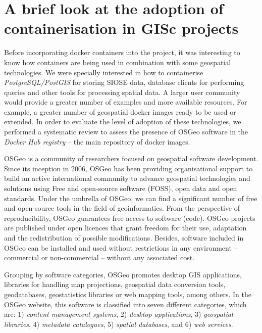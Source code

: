 \documentclass[ijgi,article,submit,moreauthors,pdftex]{Definitions/mdpi}
\begin{document}

\section{A brief look at the adoption of containerisation in GISc projects}
\label{sec:dockerhub}

Before incorporating docker containers into the project, it was interesting to know how containers are being used in combination with some geospatial technologies. We were specially interested in how to containerise \textit{PostgreSQL/PostGIS} for storing SIOSE data, database clients for performing queries and other tools for processing spatial data. A larger user community would provide a greater number of examples and more available resources. For example, a greater number of geospatial docker images ready to be used or extended. In order to evaluate the level of adoption of these technologies, we performed a systematic review to assess the presence of OSGeo software in the \textit{Docker Hub registry} -- the main repository of docker images.

OSGeo is a community of researchers focused on geospatial software development. Since its inception in 2006, OSGeo has been providing organisational support to build an active international community to advance geospatial technologies and solutions using Free and open-source software (FOSS), open data and open standards. Under the umbrella of OSGeo, we can find a significant number of free and open-source tools in the field of geoinformatics. From the perspective of reproducibility, OSGeo guarantees free access to software (code). OSGeo projects are published under open licences that grant freedom for their use, adaptation and the redistribution of possible modifications. Besides, software included in OSGeo can be installed and used without restrictions in any environment -- commercial or non-commercial -- without any associated cost.

Grouping by software categories, OSGeo promotes desktop GIS applications, libraries for handling map projections, geospatial data conversion tools, geodatabases, geostatistics libraries or web mapping tools, among others. In the OSGeo website, this software is classified into seven different categories, which are: 1) \textit{content management systems}, 2) \textit{desktop applications}, 3) \textit{geospatial libraries}, 4) \textit{metadata catalogues}, 5) \textit{spatial databases}, and 6) \textit{web services}.
\end{document}
